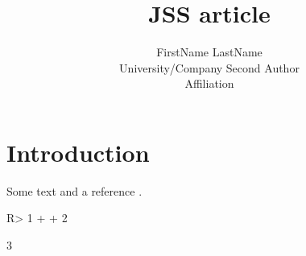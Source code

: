\documentclass[
  nojss]{jss}
\author{
FirstName LastName\\University/Company \And Second Author\\Affiliation
}
\title{JSS article}
\begin{document}
\hypertarget{introduction}{%
\section{Introduction}\label{introduction}}

Some text and a reference \citep{JSSv059i10}.

\begin{CodeChunk}

\begin{CodeInput}
R> 1 +
+   2
\end{CodeInput}

\begin{CodeOutput}
[1] 3
\end{CodeOutput}
\end{CodeChunk}


\end{document}
